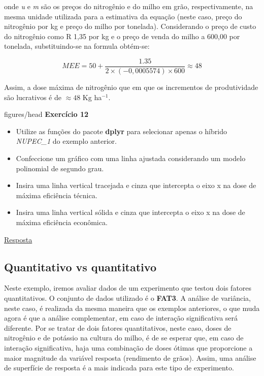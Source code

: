 \documentclass[
]{book}
\numberwithin{equation}{section}
\newcommand{\indt}[1]{\index{#1|ST}}
\newenvironment{tarefa}
  {\begin{customBlockImage}[colframe=customOrange, title=Tarefa de casa]{figures/head}}
  {\end{customBlockImage}}
\begin{document}
onde \emph{u} e \emph{m} são os preços do nitrogênio e do milho em grão, respectivamente, na mesma unidade utilizada para a estimativa da equação (neste caso, preço do nitrogênio por kg e preço do milho por tonelada). Considerando o preço de custo do nitrogênio como R 1,35 por kg e o preço de venda do milho a 600,00 por tonelada, substituindo-se na formula obtém-se:

\[
MEE = 50 + \frac{{1.35}}{{2 \times (-0,0005574) \times 600}} \approx 48
\]

Assim, a dose máxima de nitrogênio que em que os incrementos de produtividade são lucrativos é de \(\approx 48\) Kg ha\(^{-1}\).

\indt{Exercícios}
\begin{tarefa}
\textbf{Exercício 12}

\begin{itemize}
\item
  Utilize as funções do pacote \textbf{dplyr} para selecionar apenas o híbrido \emph{NUPEC\_1} do exemplo anterior.
\item
  Confeccione um gráfico com uma linha ajustada considerando um modelo polinomial de segundo grau.
\item
  Insira uma linha vertical tracejada e cinza que intercepta o eixo x na dose de máxima eficiência técnica.
\item
  Insira uma linha vertical sólida e cinza que intercepta o eixo x na dose de máxima eficiência econômica.
\end{itemize}
\end{tarefa}

\protect\hyperlink{exerc12}{Resposta}

\hypertarget{quantitativo-vs-quantitativo}{%
\subsection{Quantitativo vs quantitativo}\label{quantitativo-vs-quantitativo}}

Neste exemplo, iremos avaliar dados de um experimento que testou dois fatores quantitativos. O conjunto de dados utilizado é o \textbf{FAT3}. A análise de variância, neste caso, é realizada da mesma maneira que os exemplos anteriores, o que muda agora é que a análise complementar, em caso de interação significativa será diferente. Por se tratar de dois fatores quantitativos, neste caso, doses de nitrogênio e de potássio na cultura do milho, é de se esperar que, em caso de interação \indt{interação} significativa, haja uma combinação de doses ótimas que proporcione a maior magnitude da variável resposta (rendimento de grãos). Assim, uma análise de superfície de resposta é a mais indicada para este tipo de experimento.
\end{document}
